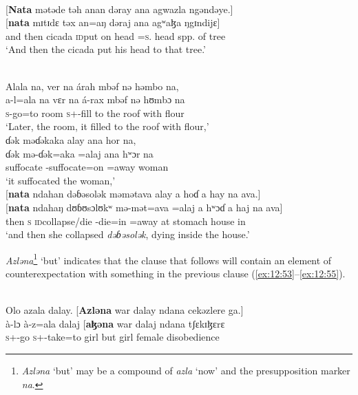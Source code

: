 \medskip  
{}\\
{}[\textbf{Nata}  mətəde  təh  anan  dəray  ana  agwazla  ngəndəye.]\\
\gll  {}[\textbf{nata}  mɪtɪdɛ təx an=aŋ dəraj ana agʷaɮa ŋgɪndijɛ]\\
      {and then}  cicada  {\textsc{id}put on head}  {\DAT}=\textsc{s}.{\IO}  head  {\DAT} {spp. of tree}  {\DEM}\\
\glt  ‘And then the cicada put his head to that tree.’ 
\z 

\clearpage
\ea \label{ex:12:52}
\\
Alala na,  ver na árah mbəf nə həmbo na,\\  
\gll  a-l=ala na vɛr na á-rax mbəf nə hʊmbɔ na\\  
      \textsc{s}-go=to  {\PSP}  room  {\PSP}  \textsc{s}+{\IFV}-fill  {to the roof}  with  flour  {\PSP}\\            
\glt ‘Later, the room, it filled to the roof with flour,’\\      
      
\medskip 
ɗək məɗəkaka alay ana hor na,\\
\gll ɗək mə-ɗək=aka =alaj ana hʷɔr na\\
     suffocate  {\NOM}{}-suffocate=on =away  {\DAT} woman  {\PSP}\\
\glt ‘it suffocated the woman,’\\
 
\medskip
{}[\textbf{nata} ndahan dəɓəsolək məmətava alay a hoɗ a hay na ava.]\\
\gll {}[\textbf{nata} ndahaŋ dʊɓʊsɔlʊkʷ mə-mət=ava =alaj a hʷɔɗ a haj na ava]\\
     then    \textsc{s}   \textsc{id}collapse/die  {\NOM}{}-die=in =away  at  stomach  {\GEN}  house  {\PSP}  in\\
 \glt  ‘and then she collapsed \textit{dəɓəsolək}, dying inside the house.’
\z 

\textit{Azləna}\footnote{\textit{Azləna} ‘but’ may be a compound of \textit{azla} ‘now’ and the presupposition marker \textit{na}.} ‘but’ indicates that the clause that follows will contain an element of counterexpectation with something in the previous clause (\ref{ex:12:53}--\ref{ex:12:55}).

\ea \label{ex:12:53}
\\
Olo  azala  dalay.  [\textbf{Azləna}  war  dalay  ndana  cekəzlere  ga.]\\
\gll  à-lɔ   à-z=ala   dalaj  [\textbf{aɮəna}  war   dalaj   ndana   tʃɛkɪɮɛrɛ\\   
      \textsc{s}+{\PFV}-go  \textsc{s}+{\PFV}-take=to  girl  but  girl  female  {\DEM}  disobedience\\ 
      
